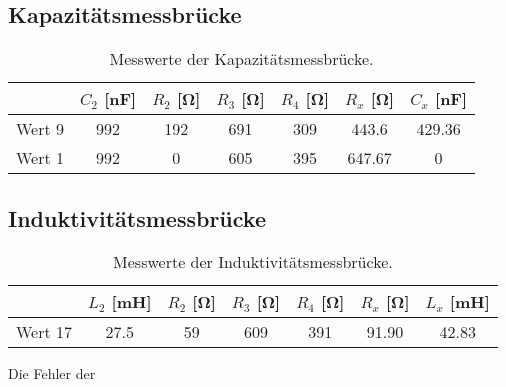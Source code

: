 \subsection{Kapazitätsmessbrücke}
\label{subsec:kap_aus}
\begin{table}[H]
  \centering
  \caption{Messwerte der Kapazitätsmessbrücke.}
  \label{tab:kap}
  \begin{tabular}{c S S S S S[table-format=3.2] S[table-format=3.2]}
   \toprule
  &{$C_2$ [\si{\nano\farad}]}&{$R_2$ [\si{\ohm}]} & {$R_3$ [\si{\ohm}]} & {$R_4$ [\si{\ohm}]}&{$R_x$ [\si{\ohm}]} & {$C_x$ [\si{\nano\farad}]}\\
  \midrule
   Wert 9 & 992 & 192 & 691 & 309 & 443.6 & 429.36\\
   Wert 1 & 992 & 0 & 605 & 395 & 647.67 & 0 \\
   \bottomrule
  \end{tabular}
\end{table}


  

\subsection{Induktivitätsmessbrücke}
\label{subsec:indu_aus}
\begin{table}[H]
  \centering
  \caption{Messwerte der Induktivitätsmessbrücke.}
  \label{tab:indu}
  \begin{tabular}{c S S S S S[table-format=3.2] S[table-format=3.2]}
  \toprule
  &{$L_2$ [\si{\milli\henry}]}&{$R_2$ [\si{\ohm}]} & {$R_3$ [\si{\ohm}]} & {$R_4$ [\si{\ohm}]}&{$R_x$ [\si{\ohm}]} & {$L_x$ [\si{\milli\henry}]}\\
  \midrule
  Wert 17& 27.5 & 59 & 609 & 391 & 91.90 & 42.83\\
  \bottomrule
  \end{tabular}
\end{table}
Die Fehler der 

